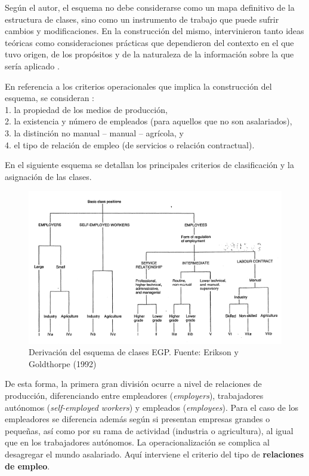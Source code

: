 \documentclass[
]{book}
\begin{document}
Según el autor, el esquema no debe considerarse como un mapa definitivo de la estructura de clases, sino como un instrumento de trabajo que puede sufrir cambios y modificaciones. En la construcción del mismo, intervinieron tanto ideas teóricas como consideraciones prácticas que dependieron del contexto en el que tuvo origen, de los propósitos y de la naturaleza de la información sobre la que sería aplicado \citep[pp.~32]{Erikson1992}.

En referencia a los criterios operacionales que implica la construcción del esquema, se consideran \citep[pp.~146]{Mendez.Gayo2007}:\\
1. la propiedad de los medios de producción,\\
2. la existencia y número de empleados (para aquellos que no son asalariados),\\
3. la distinción no manual -- manual -- agrícola, y\\
4. el tipo de relación de empleo (de servicios o relación contractual).

En el siguiente esquema se detallan los principales criterios de clasificación y la asignación de las clases.

\begin{figure}

{\centering \includegraphics[width=0.8\linewidth]{imagenes/egp1} 

}

\caption{Derivación del esquema de clases EGP. Fuente: Erikson y Goldthorpe (1992)}\label{fig:unnamed-chunk-56}
\end{figure}

De esta forma, la primera gran división ocurre a nivel de relaciones de producción, diferenciando entre empleadores (\emph{employers}), trabajadores autónomos (\emph{self-employed workers}) y empleados (\emph{employees}). Para el caso de los empleadores se diferencia además según si presentan empresas grandes o pequeñas, así como por su rama de actividad (industria o agricultura), al igual que en los trabajadores autónomos. La operacionalización se complica al desagregar el mundo asalariado. Aquí interviene el criterio del tipo de \textbf{relaciones de empleo}.
\end{document}
